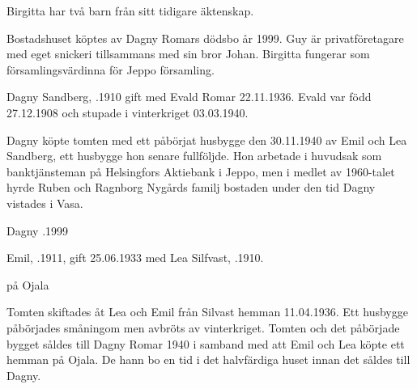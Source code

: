 Birgitta har två barn från sitt tidigare äktenskap.
\begin{jhchildren}
  \item {}
  \item {}
\end{jhchildren}
Bostadshuset köptes av Dagny Romars dödsbo år 1999. Guy är privatföretagare med eget snickeri tillsammans med sin bror Johan. Birgitta fungerar som församlingsvärdinna för Jeppo församling.


Dagny Sandberg, .1910 gift med Evald Romar 22.11.1936. Evald var född 27.12.1908 och stupade i vinterkriget 03.03.1940.
\begin{jhchildren}
  \item {}
  \item {}
\end{jhchildren}
Dagny köpte tomten med ett påbörjat husbygge den 30.11.1940 av Emil och Lea Sandberg, ett husbygge hon senare fullföljde. Hon arbetade i huvudsak som banktjänsteman på Helsingfors Aktiebank i Jeppo, men i medlet av 1960-talet hyrde Ruben och Ragnborg Nygårds familj bostaden under den tid Dagny vistades i Vasa.

Dagny .1999


Emil, .1911, gift 25.06.1933 med Lea Silfvast, .1910.
\begin{jhchildren}
  \item {}
  \item {}
  \item {} på Ojala
\end{jhchildren}

Tomten skiftades åt Lea och Emil från Silvast hemman 11.04.1936. Ett husbygge påbörjades småningom men avbröts av vinterkriget. Tomten och det påbörjade bygget såldes till Dagny Romar 1940 i samband med att Emil och Lea köpte ett hemman på Ojala. De hann bo en tid i det halvfärdiga huset innan det såldes till Dagny.

